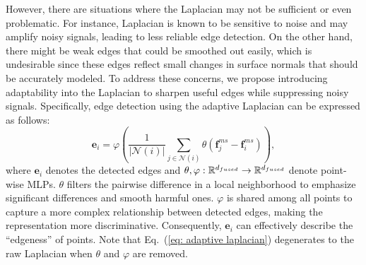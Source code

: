 \documentclass[sigconf]{acmart}
\begin{document}
However, there are situations where the Laplacian may not be sufficient or even problematic. For instance, Laplacian is known to be sensitive to noise and may amplify noisy signals, leading to less reliable edge detection. On the other hand, there might be weak edges that could be smoothed out easily, which is undesirable since these edges reflect small changes in surface normals that should be accurately modeled. To address these concerns, we propose introducing adaptability into the Laplacian to sharpen useful edges while suppressing noisy signals. Specifically, edge detection using the adaptive Laplacian can be expressed as follows:
\begin{equation}\label{eq: adaptive laplacian}
    \textbf{e}_i =\varphi \left(\frac{1}{|\mathcal{N}(i)|} \sum_{j\in\mathcal{N}(i)} \theta \left(\textbf{f}_j^{ms} - \textbf{f}_i^{ms}\right)\right), 
\end{equation}
where $\textbf{e}_i$ denotes the detected edges and $\theta,\varphi:\mathbb{R}^{d_{fused}} \to \mathbb{R}^{d_{fused}}$ denote point-wise MLPs. $\theta$ filters the pairwise difference in a local neighborhood to emphasize significant differences and smooth harmful ones. 
$\varphi$ is shared among all points to capture a more complex relationship between detected edges, making the representation more discriminative.   
Consequently, $\textbf{e}_i$ can effectively describe the ``edgeness'' of points. Note that Eq.~(\ref{eq: adaptive laplacian}) degenerates to the raw Laplacian when $\theta$ and $\varphi$ are removed.
\end{document}
